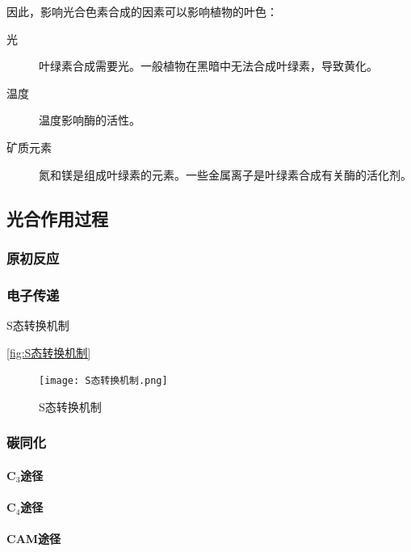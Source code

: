 因此，影响光合色素合成的因素可以影响植物的叶色：

\begin{description}
	\item[光] 叶绿素合成需要光。一般植物在黑暗中无法合成叶绿素，导致黄化。
	\item[温度] 温度影响酶的活性。
	\item[矿质元素] 氮和镁是组成叶绿素的元素。一些金属离子是叶绿素合成有关酶的活化剂。
\end{description}

\subsection{光合作用过程}

\subsubsection{原初反应}

\subsubsection{电子传递}

S态转换机制

\autoref{fig:S态转换机制}
\begin{figure}[htbp]
	\centering
	\texttt{[image: S态转换机制.png]}
	\caption{S态转换机制}
	\label{fig:S态转换机制}
\end{figure}

\subsubsection{碳同化}

\paragraph{C$_{3}$途径}

\paragraph{C$_{4}$途径}

\paragraph{CAM途径}


